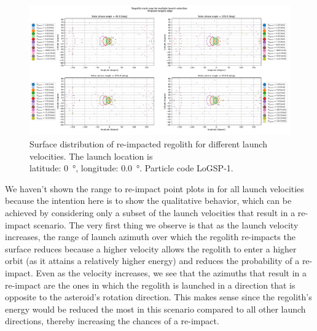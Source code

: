 \begin{figure}[htb]
\centering
\captionsetup{justification=centering}
\includegraphics[angle=90, width=\textwidth, height=\textheight, keepaspectratio=true]{longest_edge_perturbations/3.2Density_1cmSize/crash_map_all_solar_phases.pdf}
\caption{Surface distribution of re-impacted regolith for different launch velocities. The launch location is \\ latitude: \SI{0}{\degree}, longitude: \SI{0.0}{\degree}. Particle code LoGSP-1.}
\label{fig:LoGSP_1_crashmap}
\end{figure}
\FloatBarrier
We haven't shown the range to re-impact point plots in  for all launch velocities because the intention here is to show the qualitative behavior, which can be achieved by considering only a subset of the launch velocities that result in a re-impact scenario. The very first thing we observe is that as the launch velocity increases, the range of launch azimuth over which the regolith re-impacts the surface reduces because a higher velocity allows the regolith to enter a higher orbit (as it attains a relatively higher energy) and reduces the probability of a re-impact. Even as the velocity increases, we see that the azimuths that result in a re-impact are the ones in which the regolith is launched in a direction that is opposite to the asteroid's rotation direction. This makes sense since the regolith's energy would be reduced the most in this scenario compared to all other launch directions, thereby increasing the chances of a re-impact.
%
\newline\newline
%
